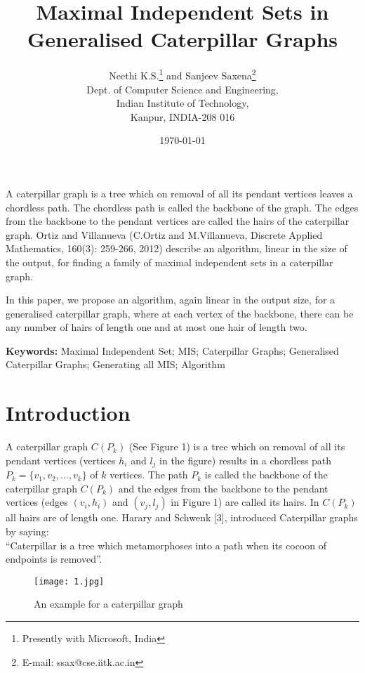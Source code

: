 \documentclass[10pt]{article}
\title{Maximal Independent Sets in Generalised Caterpillar Graphs}
\author{Neethi K.S.\thanks{Presently with Microsoft, India}
{\normalsize{and }} Sanjeev Saxena\thanks{E-mail: ssax@cse.iitk.ac.in}\\
Dept. of Computer Science and Engineering,\\ Indian Institute of
Technology,\\ Kanpur, INDIA-208 016}
\date{\today}
\begin{document}
\maketitle

\subsection*{}


A caterpillar graph is a tree which on removal of all its pendant
vertices leaves a chordless path. The chordless path is called the
backbone of the graph.  The edges from the backbone to the pendant
vertices are called the hairs of the caterpillar graph. Ortiz and
Villanueva (C.Ortiz and M.Villanueva, Discrete Applied Mathematics,
160(3): 259-266, 2012) describe an algorithm, linear in the size of the
output, for finding a family of maximal independent sets in a caterpillar
graph.

In this paper, we propose an algorithm, again linear in the output size,
for a generalised caterpillar graph, where at each vertex of the
backbone, there can be any number of hairs of length one and at most one
hair of length two. 


{\textbf{Keywords:}} Maximal Independent Set; MIS; Caterpillar Graphs;
Generalised Caterpillar Graphs; Generating all MIS; Algorithm 

\section{Introduction}

A caterpillar graph $C(P_k)$ (See Figure 1) is a tree which on removal of
all its pendant vertices (vertices $h_i$ and $l_j$ in the figure) results
in a chordless path $P_k=\{v_1,v_2,..., v_k\}$ of $k$ vertices. The path
$P_k$ is called the backbone of the caterpillar graph $C(P_k)$ and the
edges from the backbone to the pendant vertices (edges $(v_i,h_i)$ and
$(v_j,l_j)$ in Figure 1) are called its hairs.  In $C(P_k)$ all hairs are
of length one. Harary and Schwenk [3], introduced Caterpillar graphs by
saying:\\


``Caterpillar is a tree which metamorphoses into a path when its
cocoon of endpoints is removed''.




\begin{figure}[h]
\centering
\texttt{[image: 1.jpg]}
\caption{An example for a caterpillar graph}
\end{figure}
\end{document}
